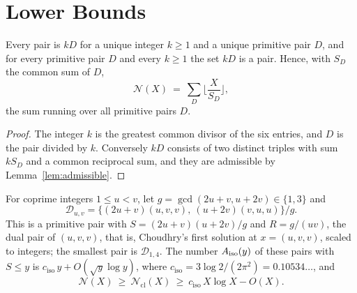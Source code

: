 \documentclass[10pt]{article}
\newcommand{\N}{\mathcal{N}}
\newcommand{\Ncl}{\mathcal{N}_{\mathrm{cl}}}
\newcommand{\ciso}{c_{\mathrm{iso}}}
\begin{document}
\section{Lower Bounds}\label{sec:lower}

\begin{lemma}\label{lem:copies}
Every pair is $kD$ for a unique integer $k\ge1$ and a unique primitive pair $D$, and for every primitive pair $D$ and every $k\ge1$ the set $kD$ is a pair. Hence, with $S_D$ the common sum of $D$,
\begin{equation}\label{eq:copies}
  \N(X)\ =\ \sum_D\Big\lfloor\frac X{S_D}\Big\rfloor,
\end{equation}
the sum running over all primitive pairs $D$.
\end{lemma}

\begin{proof}
The integer $k$ is the greatest common divisor of the six entries, and $D$ is the pair divided by $k$. Conversely $kD$ consists of two distinct triples with sum $kS_D$ and a common reciprocal sum, and they are admissible by Lemma~\ref{lem:admissible}.
\end{proof}

\begin{theorem}\label{thm:iso}
For coprime integers $1\le u<v$, let $g=\gcd(2u+v,u+2v)\in\{1,3\}$ and
\[
  \mathcal D_{u,v}=\big\{(2u+v)(u,v,v),\ (u+2v)(v,u,u)\big\}/g .
\]
This is a primitive pair with $S=(2u+v)(u+2v)/g$ and $R=g/(uv)$, the dual pair of $(u,v,v)$, that is, Choudhry's first solution \cite[\S4.1]{choudhry2011} at $x=(u,v,v)$, scaled to integers; the smallest pair is $\mathcal D_{1,4}$. The number $A_{\rm iso}(y)$ of these pairs with $S\le y$ is $\ciso\,y+O(\sqrt y\log y)$, where $\ciso=3\log2/(2\pi^2)=0.10534\ldots$, and
\[
  \N(X)\ \ge\ \Ncl(X)\ \ge\ \ciso\,X\log X-O(X).
\]
\end{theorem}
\end{document}
